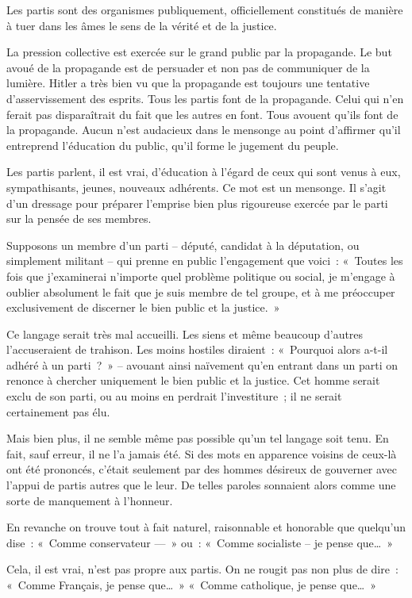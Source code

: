 \documentclass[french,twoside]{book} %
\begin{document}
Les partis sont des organismes publiquement, officiellement constitués de manière à tuer dans les âmes le sens de la vérité et de la justice.\par
La pression collective est exercée sur le grand public par la propagande. Le but avoué de la propagande est de persuader et non pas de communiquer de la lumière. Hitler a très bien vu que la propagande est toujours une tentative d’asservissement des esprits. Tous les partis font de la propagande. Celui qui n’en ferait pas disparaîtrait du fait que les autres en font. Tous avouent qu’ils font de la propagande. Aucun n’est audacieux dans le mensonge au point d’affirmer qu’il entreprend l’éducation du public, qu’il forme le jugement du peuple.\par
Les partis parlent, il est vrai, d’éducation à l’égard de ceux qui sont venus à eux, sympathisants, jeunes, nouveaux adhérents. Ce mot est un mensonge. Il s’agit d’un dressage pour préparer l’emprise bien plus rigoureuse exercée par le parti sur la pensée de ses membres.\par
Supposons un membre d’un parti – député, candidat à la députation, ou simplement militant – qui prenne en public l’engagement que voici : « Toutes les fois que j’examinerai n’importe quel problème politique ou social, je m’engage à oublier absolument le fait que je suis membre de tel groupe, et à me préoccuper exclusivement de discerner le bien public et la justice. »\par
Ce langage serait très mal accueilli. Les siens et même beaucoup d’autres l’accuseraient de trahison. Les moins hostiles diraient : « Pourquoi alors a-t-il adhéré à un parti ? » – avouant ainsi naïvement qu’en entrant dans un parti on renonce à chercher uniquement le bien public et la justice. Cet homme serait exclu de son parti, ou au moins en perdrait l’investiture ; il ne serait certainement pas élu.\par
Mais bien plus, il ne semble même pas possible qu’un tel langage soit tenu. En fait, sauf erreur, il ne l’a jamais été. Si des mots en apparence voisins de ceux-là ont été prononcés, c’était seulement par des hommes désireux de gouverner avec l’appui de partis autres que le leur. De telles paroles sonnaient alors comme une sorte de manquement à l’honneur.\par
En revanche on trouve tout à fait naturel, raisonnable et honorable que quelqu’un dise : « Comme conservateur — » ou : « Comme socialiste – je pense que… »\par
Cela, il est vrai, n’est pas propre aux partis. On ne rougit pas non plus de dire : « Comme Français, je pense que… » « Comme catholique, je pense que… »\par
\end{document}
